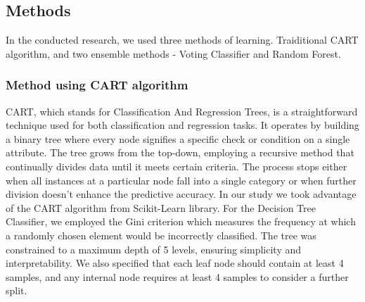 





% 


\subsection{Methods}

In the conducted research, we used three methods of learning. Traiditional CART algorithm, and two ensemble methods - Voting Classifier and Random Forest.


\subsubsection{Method using CART algorithm}
CART, which stands for Classification And Regression Trees, is a straightforward technique used for both classification and regression tasks. It operates by building a binary tree where every node signifies a specific check or condition on a single attribute. The tree grows from the top-down, employing a recursive method that continually divides data until it meets certain criteria. The process stops either when all instances at a particular node fall into a single category or when further division doesn't enhance the predictive accuracy. 
In our study we took advantage of the CART algorithm from Scikit-Learn library. For the Decision Tree Classifier, we employed the Gini criterion which measures the frequency at which a randomly chosen element would be incorrectly classified. The tree was constrained to a maximum depth of 5 levels, ensuring simplicity and interpretability. We also specified that each leaf node should contain at least 4 samples, and any internal node requires at least 4 samples to consider a further split.  

